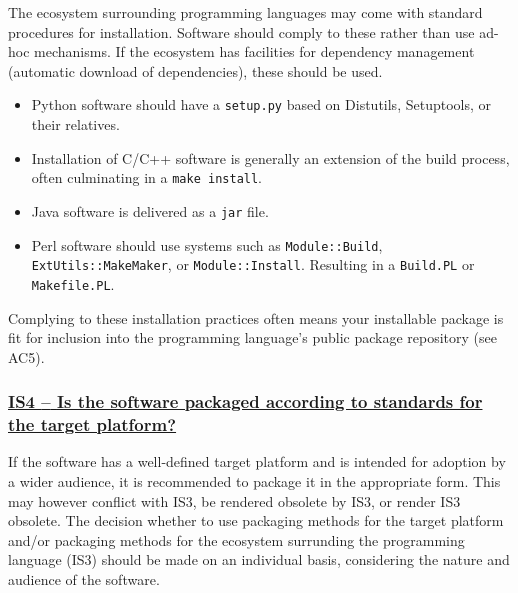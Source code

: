 \documentclass[a4paper,11pt]{article}
\newcommand{\indicator}[1]{\subsubsection*{\underline{#1}}}
\begin{document}
The ecosystem surrounding programming languages may come with standard
procedures for installation. Software should comply to these rather than use
ad-hoc mechanisms. If the ecosystem has facilities for dependency management
(automatic download of dependencies), these should be used.

\begin{itemize}
 \item Python software should have a \texttt{setup.py} based on Distutils,
     Setuptools, or their relatives.
 \item Installation of C/C++ software is generally an extension of the build
     process, often culminating in a \texttt{make install}.
 \item Java software is delivered as a \texttt{jar} file.
 \item Perl software should use systems such as \texttt{Module::Build},
     \texttt{ExtUtils::MakeMaker}, or \texttt{Module::Install}. Resulting in a
     \texttt{Build.PL} or \texttt{Makefile.PL}.
\end{itemize}

Complying to these installation practices often means your installable package
is fit for inclusion into the programming language's public package repository
(see AC5).

\newcommand{\isFourName}{IS4}
\newcommand{\isFourID}{\isFourName}
\newcommand{\isFourText}{Is the software packaged according to standards for the target platform?}
\indicator{\isFourName{ }--{ }\isFourText}\label{id:is4} 

If the software has a well-defined target platform and is intended for adoption
by a wider audience, it is recommended to package it in the appropriate form.
This may however conflict with IS3, be rendered obsolete by IS3, or render IS3
obsolete. The decision whether to use packaging methods for the target platform
and/or packaging methods for the ecosystem surrunding the programming language
(IS3) should be
%
%
%
made on an individual basis, considering the nature and audience of the
software.
\end{document}
